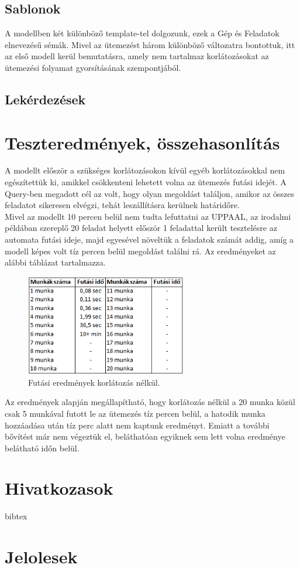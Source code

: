 \documentclass {report}
\begin{document}
    \section{Sablonok}
    A modellben két különböző template-tel dolgozunk, ezek a Gép és Feladatok elnevezésű sémák. Mivel az ütemezést három különböző változatra bontottuk, itt az első modell kerül bemutatásra, amely nem tartalmaz korlátozásokat az ütemezési folyamat gyorsításának szempontjából.
    \section{Lekérdezések}
    
\chapter{Teszteredmények, összehasonlítás}
A modellt először a szükséges korlátozásokon kívül egyéb korlátozásokkal nem egészítettük ki, amikkel csökkenteni lehetett volna az ütemezés futási idejét. A Query-ben megadott cél az volt, hogy olyan megoldást találjon, amikor az összes feladatot sikeresen elvégzi, tehát leszállításra kerülnek határidőre.\\
Mivel az modellt 10 percen belül nem tudta lefuttatni az UPPAAL, az irodalmi példában szereplő 20 feladat helyett először 1 feladattal került tesztelésre az automata futási ideje, majd egyesével növeltük a feladatok számát addig, amíg a modell képes volt tíz percen belül megoldást találni rá. Az eredményeket az alábbi táblázat tartalmazza.
\begin{figure}
\begin{center}
\includegraphics[height=4.4cm]{tablazat_2}
\caption{Futási eredmények korlátozás nélkül.}
\end{center}
\end{figure}

Az eredmények alapján megállapítható, hogy korlátozás nélkül a 20 munka közül csak 5 munkával futott le az ütemezés tíz percen belül, a hatodik munka hozzáadása után tíz perc alatt nem kaptunk eredményt. Emiatt a további bővítést már nem végeztük el, beláthatóan egyiknek sem lett volna eredménye belátható időn belül.





\chapter*{Hivatkozasok}
bibtex

\appendix

\chapter{Jelolesek}
\end{document}
